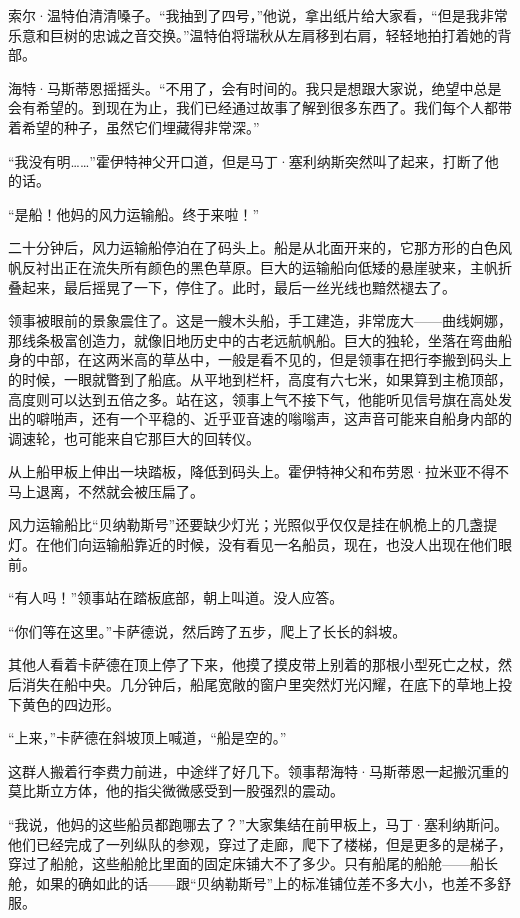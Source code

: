 \documentclass[AutoFakeBold=true]{book}
\begin{document}
索尔·温特伯清清嗓子。``我抽到了四号，''他说，拿出纸片给大家看，``但是我非常乐意和巨树的忠诚之音交换。''温特伯将瑞秋从左肩移到右肩，轻轻地拍打着她的背部。

海特·马斯蒂恩摇摇头。``不用了，会有时间的。我只是想跟大家说，绝望中总是会有希望的。到现在为止，我们已经通过故事了解到很多东西了。我们每个人都带着希望的种子，虽然它们埋藏得非常深。''

``我没有明……''霍伊特神父开口道，但是马丁·塞利纳斯突然叫了起来，打断了他的话。

``是船！他妈的风力运输船。终于来啦！''

\vspace*{1em}

二十分钟后，风力运输船停泊在了码头上。船是从北面开来的，它那方形的白色风帆反衬出正在流失所有颜色的黑色草原。巨大的运输船向低矮的悬崖驶来，主帆折叠起来，最后摇晃了一下，停住了。此时，最后一丝光线也黯然褪去了。

领事被眼前的景象震住了。这是一艘木头船，手工建造，非常庞大——曲线婀娜，那线条极富创造力，就像旧地历史中的古老远航帆船。巨大的独轮，坐落在弯曲船身的中部，在这两米高的草丛中，一般是看不见的，但是领事在把行李搬到码头上的时候，一眼就瞥到了船底。从平地到栏杆，高度有六七米，如果算到主桅顶部，高度则可以达到五倍之多。站在这，领事上气不接下气，他能听见信号旗在高处发出的噼啪声，还有一个平稳的、近乎亚音速的嗡嗡声，这声音可能来自船身内部的调速轮，也可能来自它那巨大的回转仪。

从上船甲板上伸出一块踏板，降低到码头上。霍伊特神父和布劳恩·拉米亚不得不马上退离，不然就会被压扁了。

风力运输船比``贝纳勒斯号''还要缺少灯光；光照似乎仅仅是挂在帆桅上的几盏提灯。在他们向运输船靠近的时候，没有看见一名船员，现在，也没人出现在他们眼前。

``有人吗！''领事站在踏板底部，朝上叫道。没人应答。

``你们等在这里。''卡萨德说，然后跨了五步，爬上了长长的斜坡。

其他人看着卡萨德在顶上停了下来，他摸了摸皮带上别着的那根小型死亡之杖，然后消失在船中央。几分钟后，船尾宽敞的窗户里突然灯光闪耀，在底下的草地上投下黄色的四边形。

``上来，''卡萨德在斜坡顶上喊道，``船是空的。''

这群人搬着行李费力前进，中途绊了好几下。领事帮海特·马斯蒂恩一起搬沉重的莫比斯立方体，他的指尖微微感受到一股强烈的震动。

``我说，他妈的这些船员都跑哪去了？''大家集结在前甲板上，马丁·塞利纳斯问。他们已经完成了一列纵队的参观，穿过了走廊，爬下了楼梯，但是更多的是梯子，穿过了船舱，这些船舱比里面的固定床铺大不了多少。只有船尾的船舱——船长舱，如果的确如此的话——跟``贝纳勒斯号''上的标准铺位差不多大小，也差不多舒服。
\end{document}
